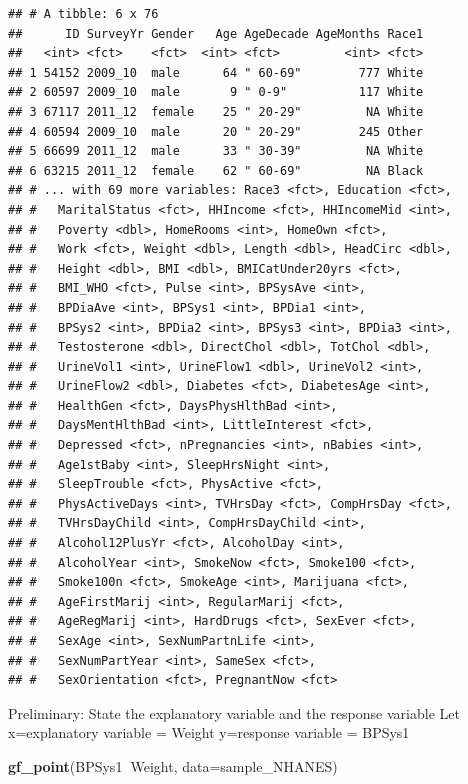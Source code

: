 \documentclass[
]{book}
\newenvironment{Shaded}{\begin{snugshade}}{\end{snugshade}}
\newcommand{\DataTypeTok}[1]{\textcolor[rgb]{0.13,0.29,0.53}{#1}}
\newcommand{\KeywordTok}[1]{\textcolor[rgb]{0.13,0.29,0.53}{\textbf{#1}}}
\newcommand{\NormalTok}[1]{#1}
\newcommand{\OperatorTok}[1]{\textcolor[rgb]{0.81,0.36,0.00}{\textbf{#1}}}
\begin{document}
\begin{verbatim}
## # A tibble: 6 x 76
##      ID SurveyYr Gender   Age AgeDecade AgeMonths Race1
##   <int> <fct>    <fct>  <int> <fct>         <int> <fct>
## 1 54152 2009_10  male      64 " 60-69"        777 White
## 2 60597 2009_10  male       9 " 0-9"          117 White
## 3 67117 2011_12  female    25 " 20-29"         NA White
## 4 60594 2009_10  male      20 " 20-29"        245 Other
## 5 66699 2011_12  male      33 " 30-39"         NA White
## 6 63215 2011_12  female    62 " 60-69"         NA Black
## # ... with 69 more variables: Race3 <fct>, Education <fct>,
## #   MaritalStatus <fct>, HHIncome <fct>, HHIncomeMid <int>,
## #   Poverty <dbl>, HomeRooms <int>, HomeOwn <fct>,
## #   Work <fct>, Weight <dbl>, Length <dbl>, HeadCirc <dbl>,
## #   Height <dbl>, BMI <dbl>, BMICatUnder20yrs <fct>,
## #   BMI_WHO <fct>, Pulse <int>, BPSysAve <int>,
## #   BPDiaAve <int>, BPSys1 <int>, BPDia1 <int>,
## #   BPSys2 <int>, BPDia2 <int>, BPSys3 <int>, BPDia3 <int>,
## #   Testosterone <dbl>, DirectChol <dbl>, TotChol <dbl>,
## #   UrineVol1 <int>, UrineFlow1 <dbl>, UrineVol2 <int>,
## #   UrineFlow2 <dbl>, Diabetes <fct>, DiabetesAge <int>,
## #   HealthGen <fct>, DaysPhysHlthBad <int>,
## #   DaysMentHlthBad <int>, LittleInterest <fct>,
## #   Depressed <fct>, nPregnancies <int>, nBabies <int>,
## #   Age1stBaby <int>, SleepHrsNight <int>,
## #   SleepTrouble <fct>, PhysActive <fct>,
## #   PhysActiveDays <int>, TVHrsDay <fct>, CompHrsDay <fct>,
## #   TVHrsDayChild <int>, CompHrsDayChild <int>,
## #   Alcohol12PlusYr <fct>, AlcoholDay <int>,
## #   AlcoholYear <int>, SmokeNow <fct>, Smoke100 <fct>,
## #   Smoke100n <fct>, SmokeAge <int>, Marijuana <fct>,
## #   AgeFirstMarij <int>, RegularMarij <fct>,
## #   AgeRegMarij <int>, HardDrugs <fct>, SexEver <fct>,
## #   SexAge <int>, SexNumPartnLife <int>,
## #   SexNumPartYear <int>, SameSex <fct>,
## #   SexOrientation <fct>, PregnantNow <fct>
\end{verbatim}

Preliminary: State the explanatory variable and the response variable
Let x=explanatory variable = Weight
y=response variable = BPSys1



\begin{Shaded}
\begin{Highlighting}[]
\KeywordTok{gf_point}\NormalTok{(BPSys1}\OperatorTok{~}\NormalTok{Weight, }\DataTypeTok{data=}\NormalTok{sample_NHANES)}
\end{Highlighting}
\end{Shaded}
\end{document}
